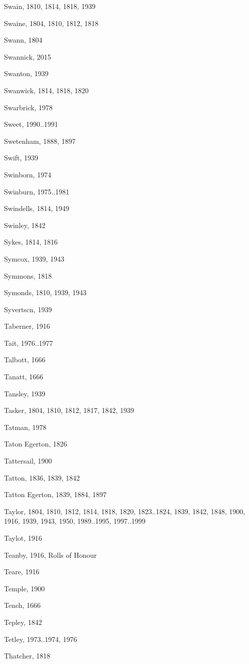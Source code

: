 \begin{theindex}
\item Swain, 1810, 1814, 1818, 1939
\item Swaine, 1804, 1810, 1812, 1818
\item Swann, 1804
\item Swannick, 2015
\item Swanton, 1939
\item Swanwick, 1814, 1818, 1820
\item Swarbrick, 1978
\item Sweet, 1990..1991
\item Swetenham, 1888, 1897
\item Swift, 1939
\item Swinborn, 1974
\item Swinburn, 1975..1981
\item Swindells, 1814, 1949
\item Swinley, 1842
\item Sykes, 1814, 1816
\item Symcox, 1939, 1943
\item Symmons, 1818
\item Symonds, 1810, 1939, 1943
\item Syvertscn, 1939
\item Taberner, 1916
\item Tait, 1976..1977
\item Talbott, 1666
\item Tanatt, 1666
\item Tansley, 1939
\item Tasker, 1804, 1810, 1812, 1817, 1842, 1939
\item Tatman, 1978
\item Taton Egerton, 1826
\item Tattersail, 1900
\item Tatton, 1836, 1839, 1842
\item Tatton Egerton, 1839, 1884, 1897
\item Taylor, 1804, 1810, 1812, 1814, 1818, 1820, 1823..1824, 1839, 1842, 1848, 1900, 1916, 1939, 1943, 1950, 1989..1995, 1997..1999
\item Taylot, 1916
\item Teanby, 1916, Rolls of Honour
\item Teare, 1916
\item Temple, 1900
\item Tench, 1666
\item Tepley, 1842
\item Tetley, 1973..1974, 1976
\item Thatcher, 1818

\end{theindex}
